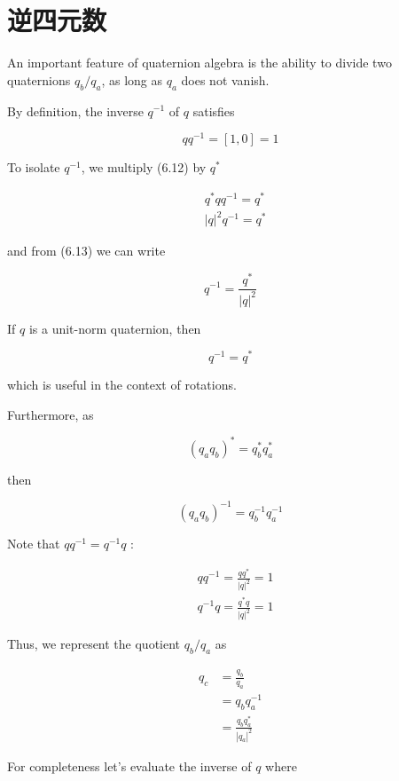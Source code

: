 \section{逆四元数}
An important feature of quaternion algebra is the ability to divide two quaternions $q_{b} / q_{a}$, as long as $q_{a}$ does not vanish.

By definition, the inverse $q^{-1}$ of $q$ satisfies

$$
    q q^{-1}=[1,0]=1
$$

To isolate $q^{-1}$, we multiply (6.12) by $q^{*}$

$$
    \begin{aligned}
         & q^{*} q q^{-1}=q^{*} \\
         & |q|^{2} q^{-1}=q^{*}
    \end{aligned}
$$

and from (6.13) we can write

$$
    q^{-1}=\frac{q^{*}}{|q|^{2}}
$$

If $q$ is a unit-norm quaternion, then

$$
    q^{-1}=q^{*}
$$

which is useful in the context of rotations.

Furthermore, as

$$
    \left(q_{a} q_{b}\right)^{*}=q_{b}^{*} q_{a}^{*}
$$

then

$$
    \left(q_{a} q_{b}\right)^{-1}=q_{b}^{-1} q_{a}^{-1}
$$

Note that $q q^{-1}=q^{-1} q$ :

$$
    \begin{aligned}
         & q q^{-1}=\frac{q q^{*}}{|q|^{2}}=1 \\
         & q^{-1} q=\frac{q^{*} q}{|q|^{2}}=1
    \end{aligned}
$$

Thus, we represent the quotient $q_{b} / q_{a}$ as

$$
    \begin{aligned}
        q_{c} & =\frac{q_{b}}{q_{a}}                            \\
              & =q_{b} q_{a}^{-1}                               \\
              & =\frac{q_{b} q_{a}^{*}}{\left|q_{a}\right|^{2}}
    \end{aligned}
$$

For completeness let's evaluate the inverse of $q$ where

